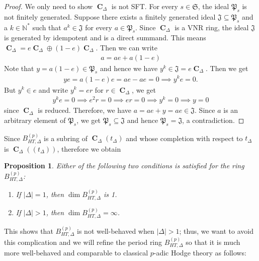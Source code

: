 \documentclass{amsart}
\newtheorem{proposition}{Proposition}[section]
\DeclareMathOperator{\C}{\textbf{C}}
\newcommand{\pmBHT}{B^{(p)}_{HT,\Delta}}
\begin{document}
\begin{proof}
    We only need to show $\C_\Delta$ is not SFT. For every $s\in\mathfrak{S}$, the ideal $\mathfrak{P}_s$ is not finitely generated. Suppose there exists a finitely generated ideal $\mathfrak{J}\subseteq\mathfrak{P}_s$ and a $k\in\mathbb{N}^*$ such that $a^k\in\mathfrak{J}$ for every $a\in\mathfrak{P}_s$. Since $\C_\Delta$ is a VNR ring, the ideal $\mathfrak{J}$ is generated by idempotent and is a direct summand. This means $\C_\Delta=e\C_\Delta\oplus(1-e)\C_\Delta$. Then we can write
    \begin{align*}
        a=ae+a(1-e)
    \end{align*}
    Note that $y=a(1-e)\in\mathfrak{P}_s$ and hence we have $y^k\in\mathfrak{J}=e\C_\Delta$. Then we get
    \begin{align*}
        ye=a(1-e)e=ae-ae=0\implies y^ke=0.
    \end{align*}
    But $y^k\in e$ and write $y^k=er$ for $r\in\C_\Delta$, we get
    \begin{align*}
        y^ke=0\implies e^2r=0\implies er=0\implies y^k=0\implies y=0
    \end{align*}
    since $\C_\Delta$ is reduced. Therefore, we have $a=ae+y=ae\in\mathfrak{J}$. Since $a$ is an arbitrary element of $\mathfrak{P}_s$, we get $\mathfrak{P}_s\subseteq\mathfrak{J}$ and hence $\mathfrak{P}_s=\mathfrak{J}$, a contradiction.
\end{proof}

Since $\pmBHT$ is a subring of $\C_\Delta(t_\Delta)$ and whose completion with respect to $t_\Delta$ is $\C_\Delta(\!(t_\Delta)\!)$, therefore we obtain

\begin{proposition}
    Either of the following two conditions is satisfied for the ring $\pmBHT$:
    \begin{enumerate}
        \item[(i)] If $|\Delta|=1$, then $\dim\pmBHT$ is 1.
        \item[(ii)] If $|\Delta|>1$, then $\dim\pmBHT=\infty$.
    \end{enumerate}
\end{proposition}

This shows that $\pmBHT$ is not well-behaved when $|\Delta|>1$; thus, we want to avoid this complication and we will refine the period ring $\pmBHT$ so that it is much more well-behaved and comparable to classical $p$-adic Hodge theory as follows:\\
\end{document}
